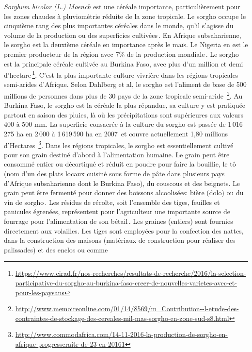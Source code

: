 \documentclass[a4paper,11pt]{article}
\begin{document}
\emph{Sorghum bicolor (L.) Moench} est une céréale importante,
particulièrement pour les zones chaudes à pluviométrie réduite de la
zone tropicale. Le sorgho occupe le cinquième rang des plus
importantes céréales dans le monde, qu’il s’agisse du volume de la
production ou des superficies cultivées\,\cite{FAOICRISAT_1997}. En
Afrique subsaharienne, le sorgho est la deuxième céréale en importance
après le maïs. Le Nigeria en est le premier producteur de la région
avec 7\% de la production mondiale\,\cite{FAO_1995}. Le sorgho est la
principale céréale cultivée au Burkina Faso, avec plus d’un million et
demi
d’hectare\,\footnote{\url{https://www.cirad.fr/nos-recherches/resultats-de-recherche/2016/la-selection-participative-du-sorgho-au-burkina-faso-creer-de-nouvelles-varietes-avec-et-pour-les-paysans}}. C’est
la plus importante culture vivrière dans les régions tropicales
semi-arides d’Afrique. Selon Dahlberg et al, le sorgho est l’aliment
de base de 500 millions de personnes dans plus de 30 pays de la zone
tropicale semi-aride
\,\footnote{\url{http://www.memoireonline.com/01/14/8569/m_Contribution--l-etude-des-contraintes-de-stockage-des-cereales-mil-mas-sorgho-en-zone-sud-s8.html}}.
Au Burkina Faso, le sorgho est la céréale la plus répandue, sa culture
y est pratiquée partout en saison des pluies, là où les précipitations
sont supérieures aux valeurs 400 à 500 mm. La superficie consacrée à
la culture du sorgho est passée de 1\,016\,275 ha en 2\,000 à
1\,619\,590 ha en 2007\,\cite{FAO_2007} et couvre actuellement 1,80
millions d’Hectares
\,\footnote{\url{http://www.commodafrica.com/14-11-2016-la-production-de-sorgho-en-afrique-progresseraitr-de-23-en-20161}}. Dans
les régions tropicales, le sorgho est essentiellement cultivé pour son
grain destiné d’abord à l’alimentation humaine. Le grain peut être
consommé entier ou décortiqué et réduit en poudre pour faire la
bouillie, le tô (nom d’un des plats locaux cuisiné sous forme de pâte
dans plusieurs pays d’Afrique subsaharienne dont le Burkina Faso), du
couscous et des beignets. Le grain peut être fermenté pour donner des
boissons alcoolisées: bière (dolo) ou du vin de
sorgho\,\cite{Memento_1991}.  Les résidus de récolte, soit l’ensemble
des tiges, feuilles et panicules égrenées, représentent pour
l’agriculteur une importante source de fourrage pour l’alimentation de
son bétail\,\cite{Chantereau_1991}. Les graines (entiers) sont
fournies directement aux volailles. Les tiges sont employées pour la
confection des nattes, dans la construction des maisons (matériaux de
construction pour réaliser des palissades) et des enclos ou comme
\end{document}
